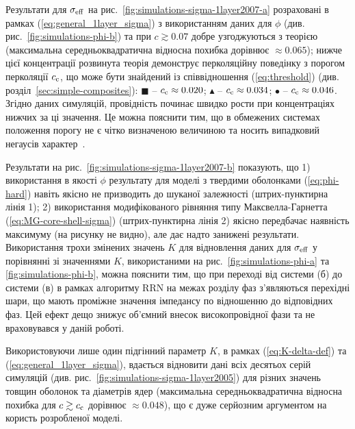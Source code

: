 \documentclass[14pt,twoside]{vakthesis}
\begin{document}
Результати для $\sigma_{\rm eff}$ на рис.~\ref{fig:simulations-sigma-1layer2007-a} розраховані в рамках (\ref{eq:general_1layer_sigma}) з використанням даних \cite{Siekierski2007} для $\phi$ (див. рис.~\ref{fig:simulations-phi-b}) та при $c \gtrsim 0.07$ добре узгоджуються з теорією {\color{violet}(максимальна  середньоквадратична відносна похибка дорівнює $\approx 0.065$)}; нижче цієї концентрації розвинута теорія демонструє перколяційну поведінку з порогом перколяції $c_{\rm c}$, що може бути знайдений із співвідношення (\ref{eq:threshold}) (див. розділ~\ref{sec:simple-composites}): $\blacksquare$ -- $c_{\rm c} \approx 0.020$; $\blacktriangle$ -- $c_{\rm c} \approx 0.034$; $\bullet$ -- $c_{\rm c} \approx 0.046$. Згідно даних симуляцій, провідність починає швидко рости при концентраціях нижчих за ці значення. Це можна пояснити тим, що в обмежених системах положення порогу не є чітко визначеною величиною та носить випадковий негаусів характер~\cite{Berlyand1997}. 

Результати на рис.~\ref{fig:simulations-sigma-1layer2007-b} показують, що 
1) використання в якості $\phi$ результату для моделі з твердими оболонками (\ref{eq:phi-hard}) навіть якісно не призводить до шуканої залежності (штрих-пунктирна лінія 1); 
2) використання модифікованого рівняння типу Максвелла-Гарнетта (\ref{eq:MG-core-shell-sigma})  (штрих-пунктирна лінія 2) якісно передбачає наявність максимуму (на рисунку не видно), але дає надто занижені результати. Використання трохи змінених значень $K$ для відновлення даних для $\sigma_{\rm eff}$ у порівнянні зі значеннями $K$, використаними на рис.~\ref{fig:simulations-phi-a} та \ref{fig:simulations-phi-b}, можна пояснити тим, що при переході від системи (б) до системи (в) в рамках алгоритму RRN на межах розділу фаз з'являються перехідні шари, що мають проміжне значення імпедансу по відношенню до відповідних фаз. Цей ефект дещо знижує об'ємний внесок високопровідної фази та не враховувався у даній роботі.

Використовуючи лише один підгінний параметр $K$, в рамках (\ref{eq:K-delta-def}) та (\ref{eq:general_1layer_sigma}), вдається відновити дані всіх десятьох серій симуляцій \cite{Siekierski2005} (див. рис.~\ref{fig:simulations-sigma-1layer2005}) для різних значень товщин оболонок та діаметрів ядер {\color{violet}(максимальна середньоквадратична відносна похибка для $c \gtrsim c_{\rm c}$ дорівнює $\approx 0.048$)}, що є дуже серйозним аргументом на користь розробленої моделі.
\end{document}

